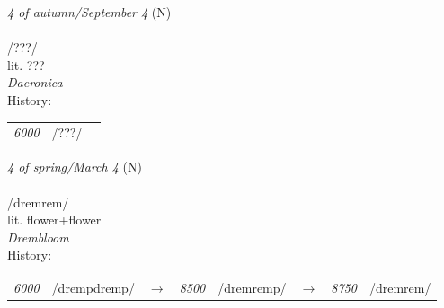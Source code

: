 \vspace{15pt}
\begin{nopagebreak}
 \textit{4 of autumn/September 4} (N)\\
\\
\noindent /???/\\
\noindent lit. ???\\
\noindent \textit{Daeronica}\\


\noindent History:

\vspace{-0pt}
\hspace{40pt}
\begin{tabular}{ccc}
\textit{6000} & /???/& \\
\end{tabular}

\vspace{20pt}\hline

\end{nopagebreak}
\filbreak



\vspace{15pt}
\begin{nopagebreak}
 \textit{4 of spring/March 4} (N)\\
\\
\noindent /dr{\textprimstress}emrem/\\
\noindent lit. flower+flower\\
\noindent \textit{Drembloom}\\


\noindent History:

\vspace{-0pt}
\hspace{40pt}
\begin{tabular}{ccc}
\textit{6000} & /drempdremp/&$\rightarrow$ & \textit{8500} & /dremremp/&$\rightarrow$ & \textit{8750} & /dremrem/& \\
\end{tabular}

\vspace{20pt}\hline

\end{nopagebreak}
\filbreak



